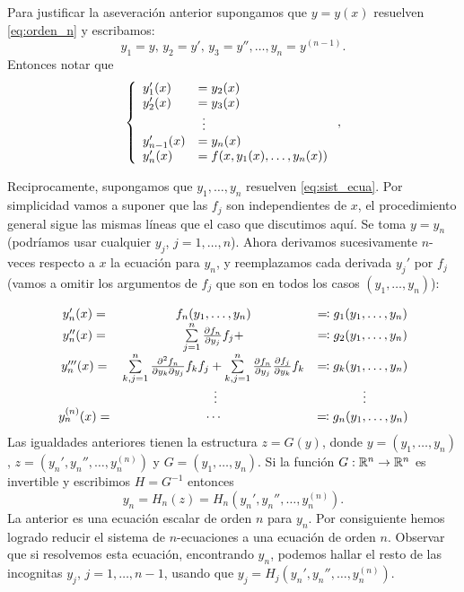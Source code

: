 Para justificar la aseveración anterior supongamos que $y=y(x)$ resuelven  \eqref{eq:orden_n} y escribamos:
\[y_1=y,\, y_2=y',\,y_3=y'',\ldots, y_{n}=y^{(n-1)}.\]
Entonces notar que
\begin{equation}\label{eq:sist_ecua_conv}
\left\{
\begin{array}{l l l}
 y_1'(x)&=y_2(x)\\
  y_2'(x)&=y_3(x)\\
       &\,\,\vdots\\
  y_{n-1}'(x)&=y_n(x)\\
 y_n'(x)&=f(x,y_1(x),\ldots,y_n(x))\\
\end{array}\right.,
\end{equation}

Reciprocamente, supongamos que $y_1,\ldots,y_n$ resuelven \eqref{eq:sist_ecua}. Por simplicidad vamos a suponer que las $f_j$ son independientes de $x$, el procedimiento general sigue las mismas líneas que el caso que discutimos aquí. Se toma $y=y_n$ (podríamos usar cualquier $y_j$, $j=1,\ldots,n$). Ahora derivamos sucesivamente $n$-veces respecto a $x$ la ecuación para $y_n$,  y reemplazamos cada derivada $y_j'$ por $f_j$ (vamos a omitir los argumentos de $f_j$ que son en todos los casos $(y_1,\ldots,y_n)$):

\[%
\begin{array}{c c c}
y_n'(x) =& f_n(y_1,\ldots,y_n) &\eqqcolon g_1(y_1,\ldots,y_n)\\
 y_n''(x)=&\sum\limits_{j=1}^n\frac{\partial f_n}{\partial y_j}f_j+
 & \eqqcolon g_2(y_1,\ldots,y_n)\\
  y_n'''(x)=&\sum\limits_{k,j=1}^n\frac{\partial^2 f_n}{\partial y_k \partial y_j}f_kf_j+
  \sum\limits_{k,j=1}^n\frac{\partial f_n}{\partial y_j}\frac{\partial f_j}{\partial y_k}f_k & \eqqcolon g_k(y_1,\ldots,y_n)\\
  &\,\,\vdots &\,\,\vdots \\
  y^{(n)}_n(x) =&\cdots & \eqqcolon g_n(y_1,\ldots,y_n)
  \\
\end{array}
\]
Las igualdades anteriores tienen la estructura $z=G(y)$, donde $y=(y_1,\ldots,y_n)$, $z=(y_n',y_n'',\ldots,y_n^{(n)})$ y $G=(y_1,\ldots,y_n)$. Si la función $G:\rr^n\to\rr^n$ es invertible y escribimos $H=G^{-1}$ entonces
\[y_n=H_n(z)=H_n(y_n',y_n'',\ldots,y_n^{(n)}).\]
La anterior es una ecuación escalar de orden $n$ para $y_n$. Por consiguiente hemos logrado reducir el sistema de $n$-ecuaciones a una ecuación de orden $n$. Observar que si resolvemos esta ecuación, encontrando $y_n$, podemos hallar el resto de las incognitas $y_j$, $j=1,\ldots,n-1$,  usando que $y_j=H_j(y_n',y_n'',\ldots,y_n^{(n)})$.


